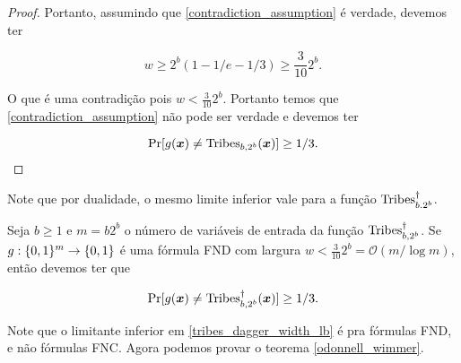 \begin{proof}
Portanto, assumindo que \ref{contradiction_assumption} é verdade, devemos ter

\begin{equation*}
    w \geq 2^{b}(1 - 1/e - 1/3) \geq \frac{3}{10}2^{b}.
\end{equation*}

O que é uma contradição pois $w < \frac{3}{10}2^{b}$. Portanto temos que \ref{contradiction_assumption} não pode ser verdade e devemos ter

\begin{equation*}
    \Pr[g(\boldsymbol{x}) \neq \text{Tribes}_{b, 2^{b}}(\boldsymbol{x})] \geq 1/3.
\end{equation*}

\end{proof}

Note que por dualidade, o mesmo limite inferior vale para a função $\text{Tribes}_{b. 2^{b}}^{\dagger}$.

\begin{teo} \label{tribes_dagger_width_lb}

Seja $b \geq 1$ e $m = b2^{b}$ o número de variáveis de entrada da função $\text{Tribes}_{b, 2^{b}}^{\dagger}$. Se $g: \{0, 1\}^{m} \to \{0, 1\}$ é uma fórmula FND com largura $w < \frac{3}{10}2^{b} = \mathcal{O}(m/\log m)$, então devemos ter que

\begin{equation*}
    \Pr[g(\boldsymbol{x}) \neq \text{Tribes}_{b, 2^{b}}^{\dagger}(\boldsymbol{x})] \geq 1/3.
\end{equation*}

\end{teo}

Note que o limitante inferior em \ref{tribes_dagger_width_lb} é pra fórmulas FND, e não fórmulas FNC. Agora podemos provar o teorema \ref{odonnell_wimmer}.

